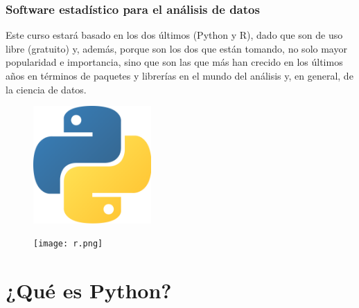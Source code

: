 \documentclass{libs/XJTLU_format}
\begin{document}
\begin{frame}[fragile] 
    \frametitle{Software estadístico para el análisis de datos}

    \begin{center}
Este curso estará basado en los dos últimos (Python y R), dado que son de uso libre (gratuito) y, además, porque son los dos que están tomando, no solo mayor popularidad e importancia, sino que son las que más han crecido en los últimos años en términos de paquetes y librerías en el mundo del análisis y, en general, de la ciencia de datos.\newline    
    \end{center}

\begin{multicols}{2}
    \begin{figure}[H]
            \includegraphics [width =0.4\textwidth]{python.png}
    \end{figure}
        \begin{figure}[H]
            \texttt{[image: r.png]}
    \end{figure}
\end{multicols}
\end{frame}

\section{¿Qué es Python?}
\end{document}
